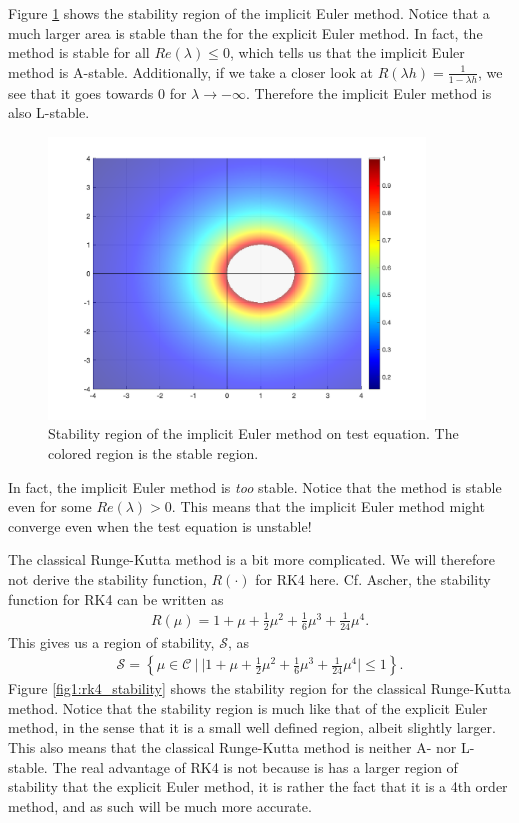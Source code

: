 Figure \ref{fig1:im_stability} shows the stability region of the implicit Euler method. Notice that a much larger area is stable than the for the explicit Euler method. In fact, the method is stable for all $Re(\lambda) \leq 0$, which tells us that the implicit Euler method is A-stable. Additionally, if we take a closer look at $R(\lambda h) = \frac{1}{1-\lambda h}$, we see that it goes towards $0$ for $\lambda \rightarrow -\infty$. Therefore the implicit Euler method is also L-stable. 

\begin{figure}[H]
    \centering
    \includegraphics[width=10cm]{graphics/opg1/im_stability.png}
    \caption{Stability region of the implicit Euler method on test equation. The colored region is the stable region.}
    \label{fig1:im_stability}
\end{figure}

In fact, the implicit Euler method is \textit{too} stable. Notice that the method is stable even for some $Re(\lambda)>0$. This means that the implicit Euler method might converge even when the test equation is unstable! 

The classical Runge-Kutta method is a bit more complicated. We will therefore not derive the stability function, $R(\cdot)$ for RK4 here. Cf. Ascher\cite{Ascher}, the stability function for RK4 can be written as
\begin{align}
    R(\mu) = 1 + \mu + \frac{1}{2}\mu^2 + \frac{1}{6} \mu^3 + \frac{1}{24} \mu^4.
\end{align}
This gives us a region of stability, $\mathcal{S}$, as
\begin{align}
    \mathcal{S} = \left \{ \mu \in \mathcal{C} \ | \ | 1 + \mu + \frac{1}{2}\mu^2 + \frac{1}{6} \mu^3 + \frac{1}{24} \mu^4| \leq 1 \right \}.
\end{align}
Figure \ref{fig1:rk4_stability} shows the stability region for the classical Runge-Kutta method. Notice that the stability region is much like that of the explicit Euler method, in the sense that it is a small well defined region, albeit slightly larger. This also means that the classical Runge-Kutta method is neither A- nor L-stable. The real advantage of RK4 is not because is has a larger region of stability that the explicit Euler method, it is rather the fact that it is a 4th order method, and as such will be much more accurate. 


